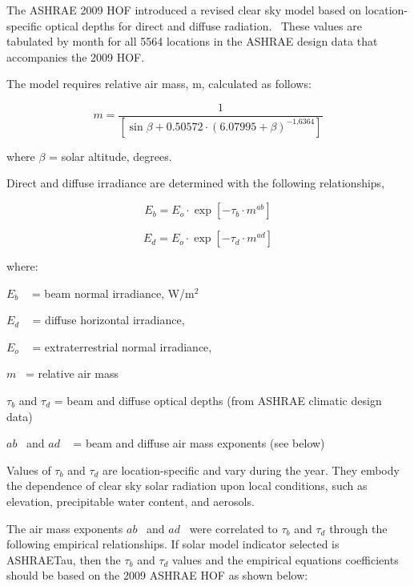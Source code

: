 The ASHRAE 2009 HOF introduced a revised clear sky model based on location-specific optical depths for direct and diffuse radiation.~ These values are tabulated by month for all 5564 locations in the ASHRAE design data that accompanies the 2009 HOF.

The model requires relative air mass, m, calculated as follows:

\begin{equation}
m = {\frac{1}{\left[ {\sin \beta  + 0.50572 \cdot {{\left( {6.07995 + \beta } \right)}^{ - 1.6364}}} \right]}}
\end{equation}

where \(\beta\) = solar altitude, degrees.

Direct and diffuse irradiance are determined with the following relationships,

\begin{equation}
{E_b} = {E_o} \cdot \exp \left[ { - {\tau_b} \cdot {m^{ab}}} \right]
\end{equation}

\begin{equation}
{E_d} = {E_o} \cdot \exp \left[ { - {\tau_d} \cdot {m^{ad}}} \right]
\end{equation}

where:

\({E_b}\) ~ = beam normal irradiance, W/m\(^{2}\)

\({E_d}\) ~ = diffuse horizontal irradiance,

\({E_o}\) ~ = extraterrestrial normal irradiance,

\emph{\(m\)}~ = relative air mass

$\tau$\(_{b}\) and $\tau$\(_{d}\) = beam and diffuse optical depths (from ASHRAE climatic design data)

\(ab\) ~and \(ad\) ~ = beam and diffuse air mass exponents (see below)

Values of $\tau$\(_{b}\) and $\tau$\(_{d}\) are location-specific and vary during the year. They embody the dependence of clear sky solar radiation upon local conditions, such as elevation, precipitable water content, and aerosols.

The air mass exponents \(ab\) ~and \(ad\) ~were correlated to $\tau$\(_{b}\) and $\tau$\(_{d}\) through the following empirical relationships. If solar model indicator selected is ASHRAETau, then the $\tau$\(_{b}\) and $\tau$\(_{d}\) values and the empirical equations coefficients should be based on the 2009 ASHRAE HOF as shown below:

